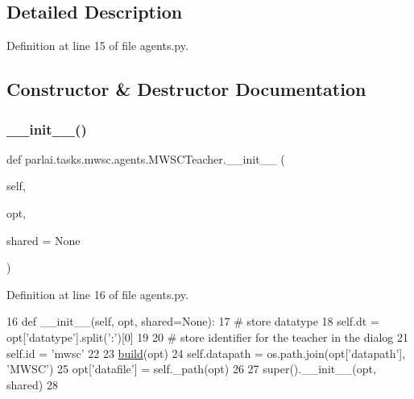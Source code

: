 \subsection{Detailed Description}


Definition at line 15 of file agents.\+py.



\subsection{Constructor \& Destructor Documentation}
\mbox{\label{classparlai_1_1tasks_1_1mwsc_1_1agents_1_1MWSCTeacher_a320ae602bd8670b70b4077d406c04e79}} 
\subsubsection{\texorpdfstring{\+\_\+\+\_\+init\+\_\+\+\_\+()}{\_\_init\_\_()}}
{\footnotesize\ttfamily def parlai.\+tasks.\+mwsc.\+agents.\+M\+W\+S\+C\+Teacher.\+\_\+\+\_\+init\+\_\+\+\_\+ (\begin{DoxyParamCaption}\item[{}]{self,  }\item[{}]{opt,  }\item[{}]{shared = {\ttfamily None} }\end{DoxyParamCaption})}



Definition at line 16 of file agents.\+py.


\begin{DoxyCode}
16     \textcolor{keyword}{def }\_\_init\_\_(self, opt, shared=None):
17         \textcolor{comment}{# store datatype}
18         self.dt = opt[\textcolor{stringliteral}{'datatype'}].split(\textcolor{stringliteral}{':'})[0]
19 
20         \textcolor{comment}{# store identifier for the teacher in the dialog}
21         self.id = \textcolor{stringliteral}{'mwsc'}
22 
23         \hyperlink{namespaceparlai_1_1mturk_1_1tasks_1_1talkthewalk_1_1download_a8c0fbb9b6dfe127cb8c1bd6e7c4e33fd}{build}(opt)
24         self.datapath = os.path.join(opt[\textcolor{stringliteral}{'datapath'}], \textcolor{stringliteral}{'MWSC'})
25         opt[\textcolor{stringliteral}{'datafile'}] = self.\_path(opt)
26 
27         super().\_\_init\_\_(opt, shared)
28 
\end{DoxyCode}


